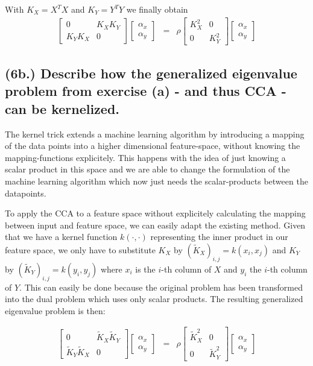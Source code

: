 \documentclass[a4paper, 12pt, titlepage]{article}
\begin{document}
With $K_X = X^TX$ and $K_Y = Y^TY$ we finally obtain
\begin{eqnarray*}
	\begin{bmatrix}
		0 & K_XK_Y\\
		K_YK_X & 0
	\end{bmatrix}
	\begin{bmatrix}
		\alpha_x\\
		\alpha_y
	\end{bmatrix} &=& \rho
	\begin{bmatrix}
		K_X^2 & 0\\
		0 &K_Y^2
	\end{bmatrix}
	\begin{bmatrix}
		\alpha_x\\
		\alpha_y
	\end{bmatrix}
\end{eqnarray*}

\subsection*{(6b.) Describe how the generalized eigenvalue problem from exercise (a) - and thus CCA - can be kernelized.}
The kernel trick extends a machine learning algorithm by introducing a mapping of the data points into a higher dimensional feature-space, without knowing the mapping-functions explicitely.  This happens with the idea of just knowing a scalar product in this space and we are able to change the formulation of the machine learning algorithm which now just needs the scalar-products between the datapoints.


To apply the CCA to a feature space without explicitely calculating the mapping between input and feature space, we can easily adapt the existing method.
Given that we have a kernel function $k(\cdot,\cdot)$ representing the inner product in our feature space, we only have to substitute $K_X$ by $(\tilde{K}_X)_{i,j} = k(x_i,x_j)$ and $K_Y$ by $(\tilde{K}_Y)_{i,j} = k(y_i,y_j)$ where $x_i$ is the $i$-th column of $X$ and $y_i$ the $i$-th column of $Y$.
This can easily be done because the original problem has been transformed into the dual problem which uses only scalar products.
The resulting generalized eigenvalue problem is then:

\begin{eqnarray*}
	\begin{bmatrix}
		0 & \tilde{K}_X\tilde{K}_Y\\
		\tilde{K}_Y\tilde{K}_X & 0
	\end{bmatrix}
	\begin{bmatrix}
		\alpha_x\\
		\alpha_y
	\end{bmatrix} &=& \rho
	\begin{bmatrix}
		\tilde{K}_X^2 & 0\\
		0 &\tilde{K}_Y^2
	\end{bmatrix}
	\begin{bmatrix}
		\alpha_x\\
		\alpha_y
	\end{bmatrix}
\end{eqnarray*}
\end{document}
